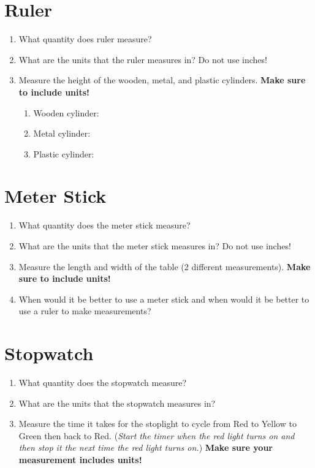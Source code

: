 \documentclass[10pt]{exam}
\begin{document}
\pagebreak

\section{Ruler}
\begin{enumerate}
  \item What quantity does ruler measure? \vs
  \item What are the units that the ruler measures in?  Do not use inches! \vs
  \item Measure the height of the wooden, metal, and plastic cylinders.  {\bf Make sure to include units!}
    \begin{enumerate}
      \item Wooden cylinder: \vs
      \item Metal cylinder: \vs
      \item Plastic cylinder: \vs
    \end{enumerate}
\end{enumerate}

\section{Meter Stick}
\begin{enumerate}
  \item What quantity does the meter stick measure? \vs
  \item What are the units that the meter stick measures in?  Do not use inches! \vs
  \item Measure the length and width of the table (2 different measurements).  {\bf Make sure to include units!} \vs
  \item When would it be better to use a meter stick and when would it be better to use a ruler to make measurements? \vs[2]
\end{enumerate}


\section{Stopwatch}
\begin{enumerate}
  \item What quantity does the stopwatch measure? \vs
  \item What are the units that the stopwatch measures in? \vs
  \item Measure the time it takes for the stoplight to cycle from Red to Yellow to Green then back to Red.  (\emph{Start the timer when the red light turns on and then stop it the next time the red light turns on.})  {\bf Make sure your measurement includes units!} \vs
\end{enumerate}
\end{document}
